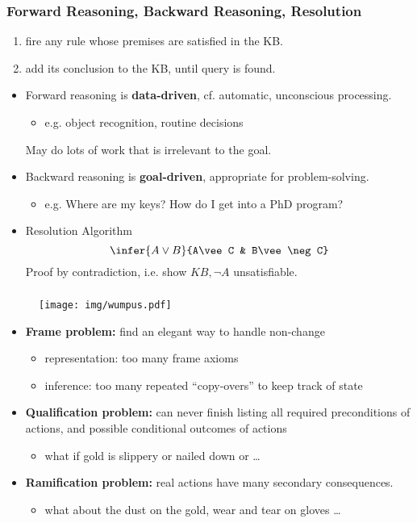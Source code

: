 \documentclass[UTF8,11pt,colorlinks,compress,openany]{beamer}%
\begin{document}
\begin{frame}\frametitle{Forward Reasoning, Backward Reasoning, Resolution}
\begin{enumerate}
	\item fire any rule whose premises are satisfied in the KB.
	\item add its conclusion to the KB, until query is found.
\end{enumerate}
\begin{itemize}
	\item Forward reasoning is \textbf{data-driven}, cf. automatic, unconscious processing.
	\begin{itemize}
		\item e.g. object recognition, routine decisions
	\end{itemize}
	May do lots of work that is irrelevant to the goal.
	\item Backward reasoning is \textbf{goal-driven}, appropriate for problem-solving.
	\begin{itemize}
		\item e.g. Where are my keys? How do I get into a PhD program?
	\end{itemize}
	\item Resolution Algorithm
	\[\infer{A\vee B}{A\vee C & B\vee\neg C}\]
	Proof by contradiction, i.e. show $KB,\neg A$ unsatisfiable.
\end{itemize}
\end{frame}

\begin{frame}\frametitle{}
\begin{figure}[H]
\texttt{[image: img/wumpus.pdf]}
\end{figure}
\begin{itemize}
	\item \textbf{Frame problem:} find an elegant way to handle non-change
	\begin{itemize}
		\item representation: too many frame axioms
		\item inference: too many repeated ``copy-overs'' to keep track of state
	\end{itemize}
	\item \textbf{Qualification problem:} can never finish listing all required preconditions of actions, and possible conditional outcomes of actions
	\begin{itemize}
		\item what if gold is slippery or nailed down or \dots
	\end{itemize}
	\item \textbf{Ramification problem:} real actions have many secondary consequences.
	\begin{itemize}
		\item what about the dust on the gold, wear and tear on gloves \dots
	\end{itemize}
\end{itemize}
\end{frame}
\end{document}
